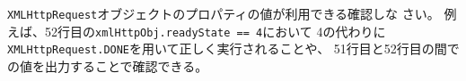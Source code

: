 \begin{Prob}\upshape
 \texttt{XMLHttpRequest}オブジェクトのプロパティの値が利用できる確認しな
 さい。
 \ifText 例えば、52行目の\Verb+xmlHttpObj.readyState == 4+において
 4の代わりに\texttt{XMLHttpRequest.DONE}を用いて正しく実行されることや、
 51行目と52行目の間での値を出力することで確認できる。
 \fi
\end{Prob}

